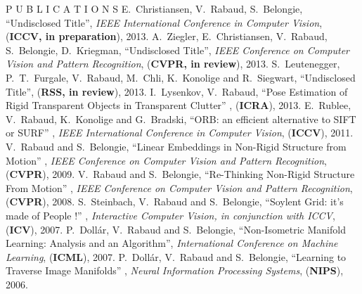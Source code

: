




\begin{rubric}{P U B L I C A T I O N S}
\entry*[2013]
E.~Christiansen, V.~Rabaud, S.~Belongie, ``Undisclosed Title'', {\em IEEE International Conference in Computer Vision}, 
(\textbf{ICCV, in preparation}), 2013.
\entry*[2013]
A.~Ziegler, E.~Christiansen, V.~Rabaud, S.~Belongie, D.~Kriegman, ``Undisclosed Title'', {\em IEEE 
Conference on Computer Vision and Pattern Recognition}, (\textbf{CVPR, in review}), 2013.
\entry*[2013]
S.~Leutenegger, P.~T.~Furgale, V.~Rabaud, M.~Chli, K.~Konolige and R.~Siegwart, ``Undisclosed Title'', 
(\textbf{RSS, in 
review}), 2013.
\entry*[2013]
I.~Lysenkov, V.~Rabaud, ``Pose Estimation of Rigid Transparent Objects in Transparent Clutter'' , 
(\textbf{ICRA}), 2013.
\entry*[2011]
E.~Rublee, V.~Rabaud, K.~Konolige and G.~Bradski, ``ORB: an efficient alternative to SIFT or SURF'' , {\em IEEE 
International Conference in Computer Vision}, (\textbf{ICCV}), 2011.
\entry*[2009]
V.~Rabaud and S.~Belongie, ``Linear Embeddings in Non-Rigid Structure from
Motion'' , {\em IEEE Conference on Computer Vision and Pattern Recognition},
(\textbf{CVPR}), 2009.
\entry*[2008]
V.~Rabaud and S.~Belongie, ``Re-Thinking Non-Rigid Structure From Motion'' ,
{\em IEEE Conference on Computer Vision and Pattern Recognition},
(\textbf{CVPR}), 2008.
\entry*[2007]
S.~Steinbach, V.~Rabaud and S.~Belongie, ``Soylent Grid: it's made of People !'' , {\em Interactive Computer Vision, in conjunction with ICCV}, (\textbf{ICV}), 2007.
\entry*[2007]
P.~Doll\'ar, V.~Rabaud and S.~Belongie, ``Non-Isometric Manifold Learning: Analysis and an Algorithm'', {\em International Conference on Machine Learning}, (\textbf{ICML}), 2007.
\entry*[2006]
P.~Doll\'ar, V.~Rabaud and S.~Belongie, ``Learning to Traverse Image Manifolds'' , {\em Neural Information Processing Systems}, (\textbf{NIPS}), 2006. 

\end{rubric}
